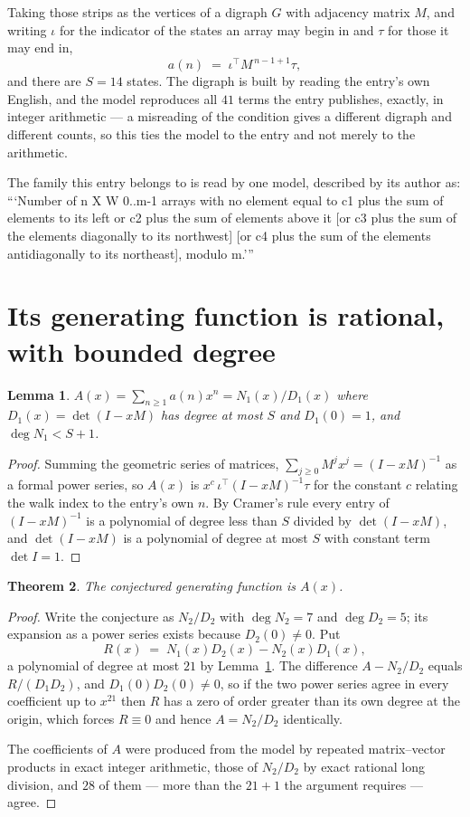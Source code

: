 \documentclass[11pt,a4paper]{article}
\theoremstyle{plain}
\newtheorem{theorem}{Theorem}
\newtheorem{lemma}[theorem]{Lemma}
\theoremstyle{definition}
\begin{document}
Taking those strips as the vertices of a digraph $G$ with adjacency matrix $M$, and writing
$\iota$ for the indicator of the states an array may begin in and $\tau$ for those it may end
in,
\[
a(n)\;=\;\iota^{\!\top}M^{\,n-1+1}\tau ,
\]
and there are $S=14$ states. The digraph is built by reading the entry's own English, and the
model reproduces all $41$ terms the entry publishes, exactly, in integer arithmetic --- a
misreading of the condition gives a different digraph and different counts, so this ties the
model to the entry and not merely to the arithmetic.

The family this entry belongs to is read by one model, described by its author as: ```Number of n X W 0..m-1 arrays with no element equal to c1 plus the sum of elements to its left or c2 plus the sum of elements above it [or c3 plus the sum of the elements diagonally to its northwest] [or c4 plus the sum of the elements antidiagonally to its northeast], modulo m.'''


\section{Its generating function is rational, with bounded degree}

\begin{lemma}\label{lem:rat}
$A(x)=\sum_{n\ge1}a(n)x^n=N_1(x)/D_1(x)$ where $D_1(x)=\det(I-xM)$ has degree at most
$S$ and $D_1(0)=1$, and $\deg N_1<S+1$.
\end{lemma}

\begin{proof}
Summing the geometric series of matrices, $\sum_{j\ge0}M^jx^j=(I-xM)^{-1}$ as a formal
power series, so $A(x)$ is $x^{c}\,\iota^{\!\top}(I-xM)^{-1}\tau$ for the constant $c$
relating the walk index to the entry's own $n$. By Cramer's rule every entry of
$(I-xM)^{-1}$ is a polynomial of degree less than $S$ divided by $\det(I-xM)$, and
$\det(I-xM)$ is a polynomial of degree at most $S$ with constant term $\det I=1$.
\end{proof}

\begin{theorem}
The conjectured generating function is $A(x)$.
\end{theorem}

\begin{proof}
Write the conjecture as $N_2/D_2$ with $\deg N_2=7$ and $\deg D_2=5$; its expansion as a
power series exists because $D_2(0)\neq0$. Put
\[
R(x)\;=\;N_1(x)D_2(x)-N_2(x)D_1(x),
\]
a polynomial of degree at most $21$ by Lemma~\ref{lem:rat}. The difference
$A-N_2/D_2$ equals $R/(D_1D_2)$, and $D_1(0)D_2(0)\neq0$, so if the two power series agree in
every coefficient up to $x^{21}$ then $R$ has a zero of order greater than its own
degree at the origin, which forces $R\equiv0$ and hence $A=N_2/D_2$ identically.

The coefficients of $A$ were produced from the model by repeated matrix--vector products in
exact integer arithmetic, those of $N_2/D_2$ by exact rational long division, and $28$
of them --- more than the $21+1$ the argument requires --- agree.
\end{proof}
\end{document}
